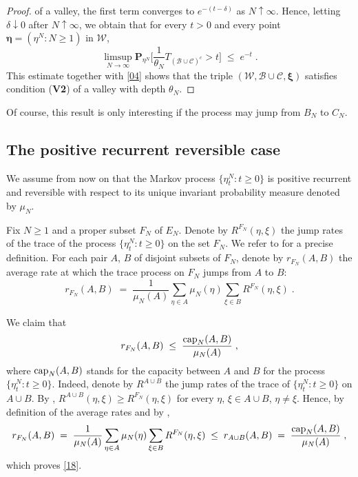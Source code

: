 \documentclass[reqno]{amsart}
\begin{document}
\begin{proof}
of a valley, the first term converges to $e^{-(t-\delta)}$ as
$N\uparrow\infty$. Hence, letting $\delta\downarrow 0$ after
$N\uparrow\infty$, we obtain that for every $t>0$ and every point ${{\boldsymbol \eta}} = (\eta^N : N\ge 1)$ in ${{\mathscr W}}$,
\begin{equation*}
\limsup_{N\to\infty} {{\mathbf P}}_{\eta^N} \Big[ \frac 1{\theta_N} 
T_{({{\mathscr B}} \cup {{\mathscr C}})^c} > t \Big] \;\le\; e^{-t}\;.
\end{equation*}
This estimate together with \eqref{04} shows that the triple $({{\mathscr W}},
{{\mathscr B}} \cup {{\mathscr C}}, {{\boldsymbol \xi}})$ satisfies condition ({\bf V2}) of a
valley with depth $\theta_N$.
\end{proof}

Of course, this result is only interesting if the process may jump
from $B_N$ to $C_N$.

\subsection{The positive recurrent reversible case}

We assume from now on that the Markov process $\{\eta^N_t : t\ge 0\}$
is positive recurrent and reversible with respect to its unique
invariant probability measure denoted by $\mu_N$.

Fix $N\ge 1$ and a proper subset $F_N$ of $E_N$. Denote by
$R^{F_N}(\eta, \xi)$ the jump rates of the trace of the process
$\{\eta^N_t : t\ge 0\}$ on the set $F_N$. We refer to \cite[Section
6.1]{bl2} for a precise definition. For each pair $A$, $B$ of disjoint
subsets of $F_N$, denote by $r_{F_N}(A,B)$ the average rate at which
the trace process on $F_N$ jumps from $A$ to $B$:
\begin{equation*}
r_{F_N}(A,B) \;=\; \frac 1{\mu_N(A)} \sum_{\eta\in A} \mu_N(\eta)
\sum_{\xi \in B} R^{F_N}(\eta, \xi)\;.
\end{equation*}

We claim that
\begin{equation}
\label{18}
r_{F_N}(A,B)\; \le\; \frac{{{\rm cap}}_N(A,B)}{\mu_N(A)}\; ,
\end{equation}
where ${{\rm cap}}_N(A,B)$ stands for the capacity between $A$ and $B$ for
the process $\{\eta^N_t : t\ge 0\}$. Indeed, denote by $R^{A\cup B}$
the jump rates of the trace of $\{\eta^N_t : t\ge 0\}$ on $A\cup
B$. By \cite[Corollary 6.2]{bl2}, $R^{A\cup B} (\eta,\xi) \ge
R^{F_N}(\eta, \xi)$ for every $\eta$, $\xi\in A\cup B$, $\eta\not =
\xi$. Hence, by definition of the average rates and by \cite[Lemma
6.7]{bl2},
\begin{equation*}
r_{F_N}(A,B) \;=\; \frac 1{\mu_N(A)} \sum_{\eta\in A} \mu_N(\eta)
\sum_{\xi \in B} R^{F_N}(\eta, \xi) \;\le \; r_{A\cup B}(A,B)
\;=\; \frac{{{\rm cap}}_N(A,B)}{\mu_N(A)}\; ,
\end{equation*}
which proves \eqref{18}.
\end{document}
